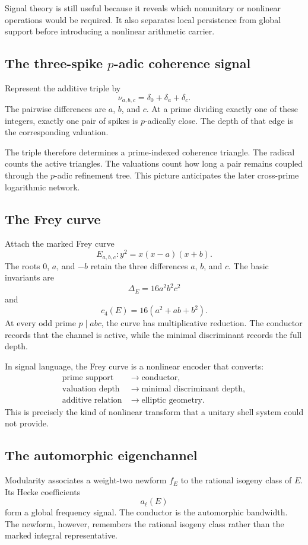 Signal theory is still useful because it reveals which nonunitary or nonlinear operations would be required. It also separates local persistence from global support before introducing a nonlinear arithmetic carrier.

\subsection{The three-spike \texorpdfstring{$p$-adic}{p-adic} coherence signal}
Represent the additive triple by
\[
 \nu_{a,b,c}=\delta_0+\delta_a+\delta_c.
\]
The pairwise differences are $a$, $b$, and $c$. At a prime dividing exactly one of these integers, exactly one pair of spikes is $p$-adically close. The depth of that edge is the corresponding valuation.

The triple therefore determines a prime-indexed coherence triangle. The radical counts the active triangles. The valuations count how long a pair remains coupled through the $p$-adic refinement tree. This picture anticipates the later cross-prime logarithmic network.

\subsection{The Frey curve}
Attach the marked Frey curve
\[
 \boxed{
 E_{a,b,c}:y^2=x(x-a)(x+b).
 }
\]
The roots $0$, $a$, and $-b$ retain the three differences $a$, $b$, and $c$. The basic invariants are
\[
 \Delta_E=16a^2b^2c^2
\]
and
\[
 c_4(E)=16(a^2+ab+b^2).
\]
At every odd prime $p\mid abc$, the curve has multiplicative reduction. The conductor records that the channel is active, while the minimal discriminant records the full depth.

In signal language, the Frey curve is a nonlinear encoder that converts:
\[
 \begin{aligned}
 \text{prime support}&\longrightarrow\text{conductor},\\
 \text{valuation depth}&\longrightarrow\text{minimal discriminant depth},\\
 \text{additive relation}&\longrightarrow\text{elliptic geometry}.
 \end{aligned}
\]
This is precisely the kind of nonlinear transform that a unitary shell system could not provide.

\subsection{The automorphic eigenchannel}
Modularity associates a weight-two newform $f_E$ to the rational isogeny class of $E$. Its Hecke coefficients
\[
 a_\ell(E)
\]
form a global frequency signal. The conductor is the automorphic bandwidth. The newform, however, remembers the rational isogeny class rather than the marked integral representative.


